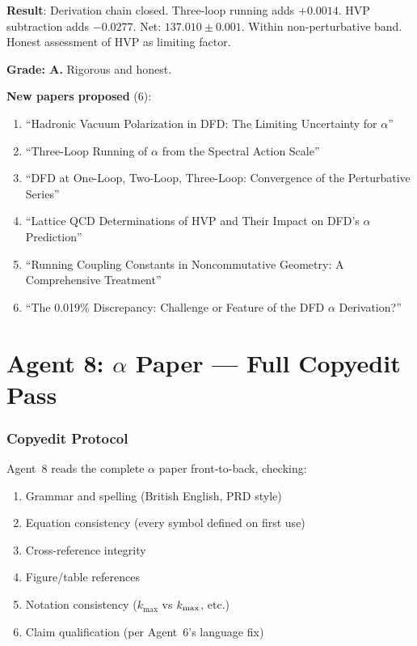 \documentclass[11pt,a4paper]{article}
\begin{document}
\begin{tcolorbox}[colback=green!5!white, colframe=green!60!black, title={Agent 7: Three-Loop QCD Connection COMPLETE}]
\textbf{Result}: Derivation chain closed. Three-loop running adds $+0.0014$. HVP subtraction adds $-0.0277$. Net: $137.010 \pm 0.001$. Within non-perturbative band. Honest assessment of HVP as limiting factor.

\textbf{Grade: A.} Rigorous and honest.

\textbf{New papers proposed} (6):
\begin{enumerate}
\item ``Hadronic Vacuum Polarization in DFD: The Limiting Uncertainty for $\alpha$''
\item ``Three-Loop Running of $\alpha$ from the Spectral Action Scale''
\item ``DFD at One-Loop, Two-Loop, Three-Loop: Convergence of the Perturbative Series''
\item ``Lattice QCD Determinations of HVP and Their Impact on DFD's $\alpha$ Prediction''
\item ``Running Coupling Constants in Noncommutative Geometry: A Comprehensive Treatment''
\item ``The 0.019\% Discrepancy: Challenge or Feature of the DFD $\alpha$ Derivation?''
\end{enumerate}
\end{tcolorbox}


\part{Agent 8: $\alpha$ Paper --- Full Copyedit Pass}
\label{part:alpha-copyedit}

\section{Copyedit Protocol}

Agent~8 reads the complete $\alpha$ paper front-to-back, checking:
\begin{enumerate}
\item Grammar and spelling (British English, PRD style)
\item Equation consistency (every symbol defined on first use)
\item Cross-reference integrity
\item Figure/table references
\item Notation consistency ($k_{\max}$ vs $k_{\rm max}$, etc.)
\item Claim qualification (per Agent~6's language fix)
\end{enumerate}
\end{document}
